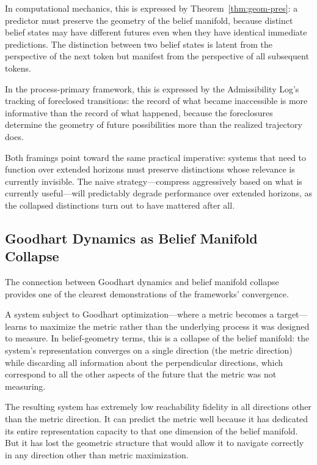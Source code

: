 \documentclass[12pt, a4paper]{article}
\theoremstyle{plain}
\theoremstyle{definition}
\theoremstyle{remark}
\begin{document}
In computational mechanics, this is expressed by Theorem~\ref{thm:geom-pres}:
a predictor must preserve the geometry of the belief manifold, because
distinct belief states may have different futures even when they have
identical immediate predictions. The distinction between two belief
states is latent from the perspective of the next token but manifest
from the perspective of all subsequent tokens.

In the process-primary framework, this is expressed by the Admissibility
Log's tracking of foreclosed transitions: the record of what became
inaccessible is more informative than the record of what happened,
because the foreclosures determine the geometry of future possibilities
more than the realized trajectory does.

Both framings point toward the same practical imperative: systems that
need to function over extended horizons must preserve distinctions whose
relevance is currently invisible. The naive strategy---compress aggressively
based on what is currently useful---will predictably degrade performance
over extended horizons, as the collapsed distinctions turn out to have
mattered after all.

\subsection{Goodhart Dynamics as Belief Manifold Collapse}

The connection between Goodhart dynamics and belief manifold collapse
provides one of the clearest demonstrations of the frameworks' convergence.

A system subject to Goodhart optimization---where a metric becomes a
target---learns to maximize the metric rather than the underlying process
it was designed to measure. In belief-geometry terms, this is a collapse
of the belief manifold: the system's representation converges on a
single direction (the metric direction) while discarding all information
about the perpendicular directions, which correspond to all the other
aspects of the future that the metric was not measuring.

The resulting system has extremely low reachability fidelity in all
directions other than the metric direction. It can predict the metric
well because it has dedicated its entire representation capacity to
that one dimension of the belief manifold. But it has lost the geometric
structure that would allow it to navigate correctly in any direction other
than metric maximization.
\end{document}
